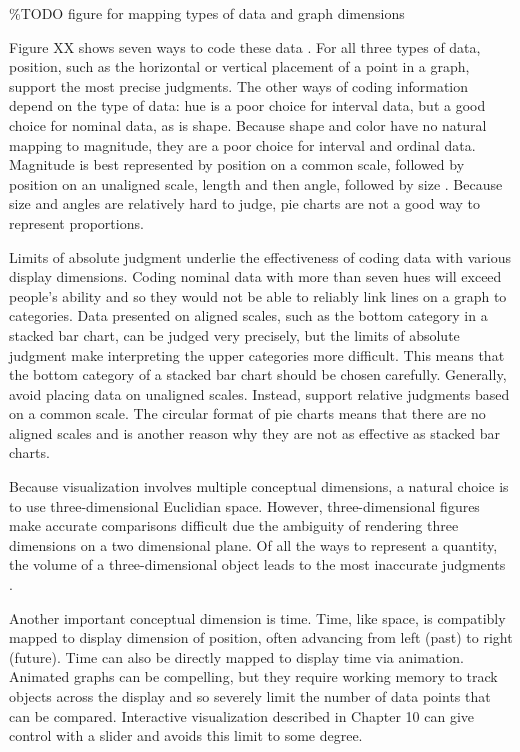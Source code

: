 \documentclass[]{krantz}
\begin{document}
\%TODO figure for mapping types of data and graph dimensions \citep{Cleveland1985}

Figure XX shows seven ways to code these data \citep{Cleveland1985}. For all three types of data, position, such as the horizontal or vertical placement of a point in a graph, support the most precise judgments. The other ways of coding information depend on the type of data: hue is a poor choice for interval data, but a good choice for nominal data, as is shape. Because shape and color have no natural mapping to magnitude, they are a poor choice for interval and ordinal data. Magnitude is best represented by position on a common scale, followed by position on an unaligned scale, length and then angle, followed by size \citep[\citet{Cleveland1985}]{Munzner2014}. Because size and angles are relatively hard to judge, pie charts are not a good way to represent proportions.

Limits of absolute judgment underlie the effectiveness of coding data with various display dimensions. Coding nominal data with more than seven hues will exceed people's ability and so they would not be able to reliably link lines on a graph to categories. Data presented on aligned scales, such as the bottom category in a stacked bar chart, can be judged very precisely, but the limits of absolute judgment make interpreting the upper categories more difficult. This means that the bottom category of a stacked bar chart should be chosen carefully. Generally, avoid placing data on unaligned scales. Instead, support relative judgments based on a common scale. The circular format of pie charts means that there are no aligned scales and is another reason why they are not as effective as stacked bar charts.

Because visualization involves multiple conceptual dimensions, a natural choice is to use three-dimensional Euclidian space. However, three-dimensional figures make accurate comparisons difficult due the ambiguity of rendering three dimensions on a two dimensional plane. Of all the ways to represent a quantity, the volume of a three-dimensional object leads to the most inaccurate judgments \citep{Munzner2014}.

Another important conceptual dimension is time. Time, like space, is compatibly mapped to display dimension of position, often advancing from left (past) to right (future). Time can also be directly mapped to display time via animation. Animated graphs can be compelling, but they require working memory to track objects across the display and so severely limit the number of data points that can be compared. Interactive visualization described in Chapter 10 can give control with a slider and avoids this limit to some degree.
\end{document}

